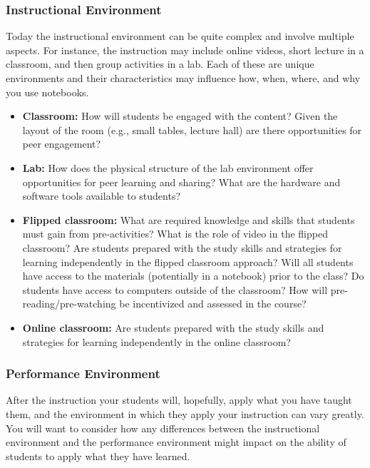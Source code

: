 \documentclass[]{book}
\providecommand{\tightlist}{%
  \setlength{\itemsep}{0pt}\setlength{\parskip}{0pt}}
\begin{document}
\subsubsection{Instructional
Environment}\label{instructional-environment}

Today the instructional environment can be quite complex and involve
multiple aspects. For instance, the instruction may include online
videos, short lecture in a classroom, and then group activities in a
lab. Each of these are unique environments and their characteristics may
influence how, when, where, and why you use notebooks.

\begin{itemize}
\tightlist
\item
  \textbf{Classroom:} How will students be engaged with the content?
  Given the layout of the room (e.g., small tables, lecture hall) are
  there opportunities for peer engagement?
\item
  \textbf{Lab:} How does the physical structure of the lab environment
  offer opportunities for peer learning and sharing? What are the
  hardware and software tools available to students?
\item
  \textbf{Flipped classroom:} What are required knowledge and skills
  that students must gain from pre-activities? What is the role of video
  in the flipped classroom? Are students prepared with the study skills
  and strategies for learning independently in the flipped classroom
  approach? Will all students have access to the materials (potentially
  in a notebook) prior to the class? Do students have access to
  computers outside of the classroom? How will pre-reading/pre-watching
  be incentivized and assessed in the course?
\item
  \textbf{Online classroom:} Are students prepared with the study skills
  and strategies for learning independently in the online classroom?
\end{itemize}

\subsubsection{Performance Environment}\label{performance-environment}

After the instruction your students will, hopefully, apply what you have
taught them, and the environment in which they apply your instruction
can vary greatly. You will want to consider how any differences between
the instructional environment and the performance environment might
impact on the ability of students to apply what they have learned.
\end{document}
